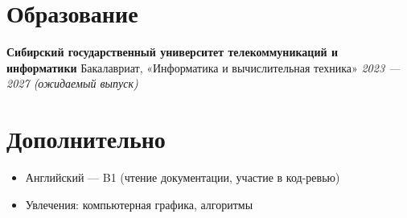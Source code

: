 \documentclass[a4paper,10pt]{article}
\begin{document}
\section*{Образование}
\textbf{Сибирский государственный университет телекоммуникаций и информатики}  
Бакалавриат, «Информатика и вычислительная техника»  
\textit{2023 — 2027 (ожидаемый выпуск)}

\section*{Дополнительно}
\begin{itemize}[noitemsep]
    \item Английский — B1 (чтение документации, участие в код-ревью)
    \item Увлечения: компьютерная графика, алгоритмы
\end{itemize}
\end{document}
